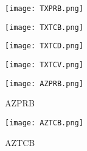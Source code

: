 \begin{figure}
\begin{minipage}[h]{0.5\textwidth}
\centering
\texttt{[image: TXPRB.png]}
 \label{fig:TXPRB}
\end{minipage}
\begin{minipage}[h]{0.5\textwidth}
\centering
\texttt{[image: TXTCB.png]}
 \label{fig:TXTCB}
\end{minipage}
\end{figure}

\begin{figure}
\begin{minipage}[h]{0.5\textwidth}
\centering
\texttt{[image: TXTCD.png]}
 \label{fig:TXTCD}
\end{minipage}
\begin{minipage}[h]{0.5\textwidth}
\centering
\texttt{[image: TXTCV.png]}
 \label{fig:TXTCV}
\end{minipage}
\end{figure}

\begin{figure}[H]
\begin{minipage}[htb]{0.5\textwidth}
\centering
\texttt{[image: AZPRB.png]}
\caption{AZPRB} \label{fig:AZPRB}
\end{minipage}
\begin{minipage}[htb]{0.5\textwidth}
\centering
\texttt{[image: AZTCB.png]}
\caption{AZTCB} \label{fig:AZTCB}
\end{minipage}
\end{figure}